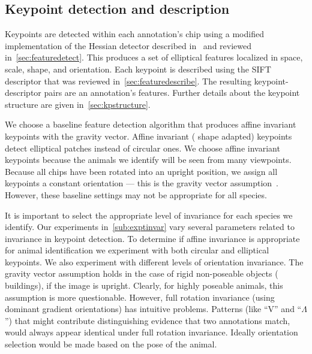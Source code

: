     \subsection{Keypoint detection and description}

        Keypoints are detected within each annotation's chip using a modified implementation of the Hessian
        detector described in~\cite{perdoch_efficient_2009} and reviewed in~\cref{sec:featuredetect}. This produces
        a set of elliptical features localized in space, scale, shape, and orientation. Each keypoint is described
        using the SIFT~\cite{lowe_distinctive_2004} descriptor that was reviewed in~\cref{sec:featuredescribe}. The
        resulting keypoint-descriptor pairs are an annotation's features. Further details about the keypoint
        structure are given in~\cref{sec:kpstructure}.

        We choose a baseline feature detection algorithm that produces affine invariant keypoints with the gravity
        vector. Affine invariant (\ie{} shape adapted) keypoints detect elliptical patches instead of circular
        ones. We choose affine invariant keypoints because the animals we identify will be seen from many
        viewpoints. Because all chips have been rotated into an upright position, we assign all keypoints a
        constant orientation --- this is the gravity vector assumption~\cite{perdoch_efficient_2009}. However,
        these baseline settings may not be appropriate for all species.

        It is important to select the appropriate level of invariance for each species we identify.
        Our experiments in~\cref{sub:exptinvar} vary several parameters related to invariance in keypoint
        detection. To determine if affine invariance is appropriate for animal identification we experiment with
        both circular and elliptical keypoints.
        We also experiment with different levels of orientation invariance. The gravity vector assumption holds in
        the case of rigid non-poseable objects (\eg{} buildings), if the image is upright. Clearly, for highly
        poseable animals, this assumption is more questionable. However, full rotation invariance (using dominant
        gradient orientations) has intuitive problems. Patterns (like ``V'' and ``$\Lambda$'') that might
        contribute distinguishing evidence that two annotations match, would always appear identical under full
        rotation invariance. Ideally orientation selection would be made based on the pose of the animal.

